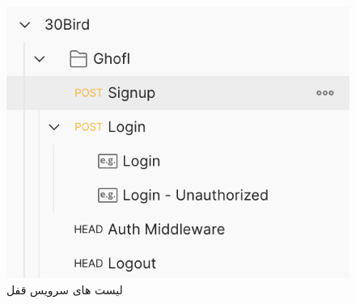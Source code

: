 \begin{figure}
	\vspace{1cm}
	\centering
	\includegraphics[scale=0.7]{figures/ghofl-api.png}
	\caption{لیست های سرویس قفل}
	\label{fig:ghofl-api}
\end{figure}



